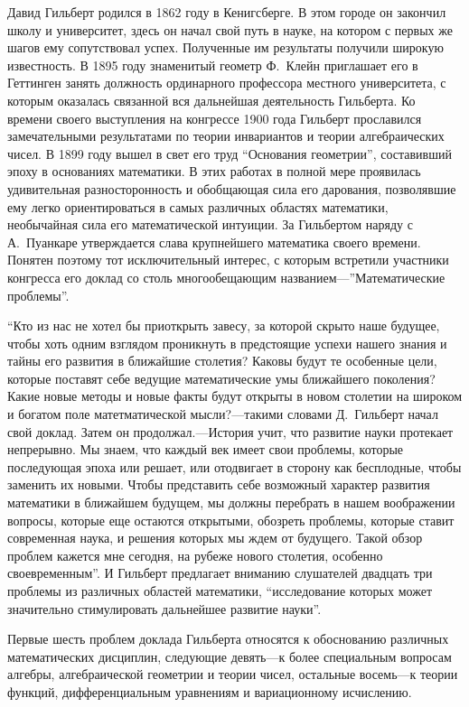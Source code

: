 \documentclass[twocolumn,10pt]{article}
\begin{document}
Давид Гильберт родился в 1862 году в Кенигсберге. В этом городе он закончил школу и университет, здесь он начал свой путь в науке, на котором с первых же шагов ему сопутствовал успех. Полученные им результаты получили широкую известность. В 1895 году знаменитый геометр Ф.~Клейн приглашает его в Геттинген занять должность ординарного профессора местного университета, с которым оказалась связанной вся дальнейшая деятельность Гильберта. Ко времени своего выступления на конгрессе 1900 года Гильберт прославился замечательными результатами по теории инвариантов и теории алгебраических чисел. В 1899 году вышел в свет его труд ``Основания геометрии'', составивший эпоху в основаниях математики. В этих работах в полной мере проявилась удивительная разносторонность и обобщающая сила его дарования, позволявшие ему легко ориентироваться в самых различных областях математики, необычайная сила его математической интуиции. За Гильбертом наряду с А.~Пуанкаре утверждается слава крупнейшего математика своего времени. Понятен поэтому тот исключительный интерес, с которым встретили участники конгресса его доклад со столь многообещающим названием---''Математические проблемы''.

``Кто из нас не хотел бы приоткрыть завесу, за которой скрыто наше будущее, чтобы хоть одним взглядом проникнуть в предстоящие успехи нашего знания и тайны его развития в ближайшие столетия? Каковы будут те особенные цели, которые поставят себе ведущие математические умы ближайшего поколения? Какие новые методы и новые факты будут открыты в новом столетии на широком и богатом поле матетматической мысли?---такими словами Д.~Гильберт начал свой доклад. Затем он продолжал.---История учит, что развитие науки протекает непрерывно. Мы знаем, что каждый век имеет свои проблемы, которые последующая эпоха или решает, или отодвигает в сторону как бесплодные, чтобы заменить их новыми. Чтобы представить себе возможный характер развития математики в ближайшем будущем, мы должны перебрать в нашем воображении вопросы, которые еще остаются открытыми, обозреть проблемы, которые ставит современная наука, и решения которых мы ждем от будущего. Такой обзор проблем кажется мне сегодня, на рубеже нового столетия, особенно своевременным''. И Гильберт предлагает вниманию слушателей двадцать три проблемы из различных областей математики, ``исследование которых может значительно стимулировать дальнейшее развитие науки''.

Первые шесть проблем доклада Гильберта относятся к обоснованию различных математических дисциплин, следующие девять---к более специальным вопросам алгебры, алгебраической геометрии и теории чисел, остальные восемь---к теории функций, дифференциальным уравнениям и вариационному исчислению.
\end{document}
